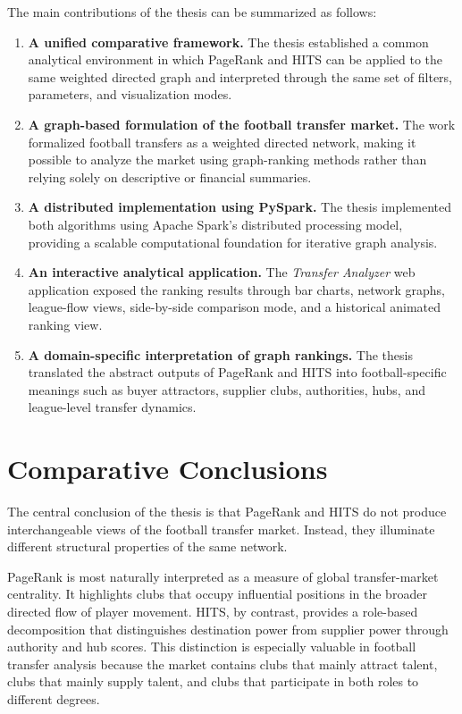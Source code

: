 The main contributions of the thesis can be summarized as follows:
\begin{enumerate}
    \item \textbf{A unified comparative framework.} The thesis established a common analytical environment in which PageRank and HITS can be applied to the same weighted directed graph and interpreted through the same set of filters, parameters, and visualization modes.

    \item \textbf{A graph-based formulation of the football transfer market.} The work formalized football transfers as a weighted directed network, making it possible to analyze the market using graph-ranking methods rather than relying solely on descriptive or financial summaries.

    \item \textbf{A distributed implementation using PySpark.} The thesis implemented both algorithms using Apache Spark's distributed processing model, providing a scalable computational foundation for iterative graph analysis.

    \item \textbf{An interactive analytical application.} The \textit{Transfer Analyzer} web application exposed the ranking results through bar charts, network graphs, league-flow views, side-by-side comparison mode, and a historical animated ranking view.

    \item \textbf{A domain-specific interpretation of graph rankings.} The thesis translated the abstract outputs of PageRank and HITS into football-specific meanings such as buyer attractors, supplier clubs, authorities, hubs, and league-level transfer dynamics.
\end{enumerate}

\section{Comparative Conclusions}
\label{sec:conclusion_findings}

The central conclusion of the thesis is that PageRank and HITS do not produce interchangeable views of the football transfer market. Instead, they illuminate different structural properties of the same network.

PageRank is most naturally interpreted as a measure of global transfer-market centrality. It highlights clubs that occupy influential positions in the broader directed flow of player movement. HITS, by contrast, provides a role-based decomposition that distinguishes destination power from supplier power through authority and hub scores. This distinction is especially valuable in football transfer analysis because the market contains clubs that mainly attract talent, clubs that mainly supply talent, and clubs that participate in both roles to different degrees.

